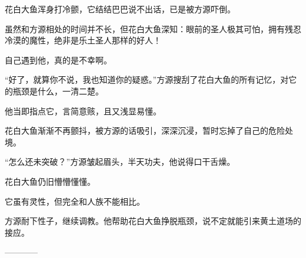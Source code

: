 \begin{this_body}
花白大鱼浑身打冷颤，它结结巴巴说不出话，已是被方源吓倒。

虽然和方源相处的时间并不长，但花白大鱼深知：眼前的圣人极其可怕，拥有残忍冷漠的魔性，绝非是乐土圣人那样的好人！

自己遇到他，真的是不幸啊。

“好了，就算你不说，我也知道你的疑惑。”方源搜刮了花白大鱼的所有记忆，对它的瓶颈是什么，一清二楚。

他当即指点它，言简意赅，且又浅显易懂。

花白大鱼渐渐不再颤抖，被方源的话吸引，深深沉浸，暂时忘掉了自己的危险处境。

“怎么还未突破？”方源皱起眉头，半天功夫，他说得口干舌燥。

花白大鱼仍旧懵懵懂懂。

它虽有灵性，但完全和人族不能相比。

方源耐下性子，继续调教。他帮助花白大鱼挣脱瓶颈，说不定就能引来黄土道场的接应。

------------

\end{this_body}

